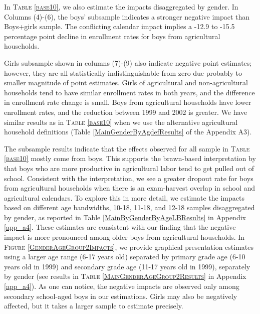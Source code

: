 \documentclass[12pt,letterpaper]{article}
\newcommand{\0}{\ensuremath{\mbox{\boldmath $0$}}}
\begin{document}
In \textsc{\small Table \ref{base10}}, we also estimate the impacts disaggregated by gender. In Columns (4)-(6), the boys' subsample indicates a stronger negative impact than Boys+girls sample. The conflicting calendar impact implies a -12.9 to -15.5 percentage point decline in enrollment rates for boys from agricultural households. 

Girls subsample shown in columns (7)-(9) also indicate negative point estimates; however, they are all statistically indistinguishable from zero due probably to smaller magnitude of point estimates. Girls of agricultural and non-agricultural households tend to have similar enrollment rates in both years, and the difference in enrollment rate change is small. Boys from agricultural households have lower enrollment rates, and the reduction between 1999 and 2002 is greater. We have similar results as in \textsc{\small Table \ref{base10}} when we use the alternative agricultural household definitions (\textsf{\small Table \ref{MainGenderByAgdefResults}} of the Appendix A3). 

The subsample results indicate that the effects observed for all sample in \textsc{\small Table \ref{base10}} mostly come from boys. This supports the brawn-based interpretation by \cite{PittRosenzweigHassan2010} that boys who are more productive in agricultural labor tend to get pulled out of school. Consistent with the interpretation, we see a greater dropout rate for boys from agricultural households when there is an exam-harvest overlap in school and agricultural calendars. To explore this in more detail, we estimate the impacts based on different age bandwidths, 10-18, 11-18, and 12-18 samples disaggregated by gender, as reported in Table \ref{MainByGenderByAgeLBResults} in Appendix \ref{app_a4}. These estimates are consistent with our finding that the negative impact is more pronounced among older boys from agricultural households. In \textsc{\small Figure \ref{GenderAgeGroup2Impacts}}, we provide graphical presentation estimates using a larger age range (6-17 years old) separated by primary grade age (6-10 years old in 1999) and secondary grade age (11-17 years old in 1999), separately by gender (see results in \textsc{\small Table \ref{MainGenderAgeGroup2Results}} in Appendix \ref{app_a4}). As one can notice, the negative impacts are observed only among secondary school-aged boys in our estimations. Girls may also be negatively affected, but it takes a larger sample to estimate precisely.
\end{document}
